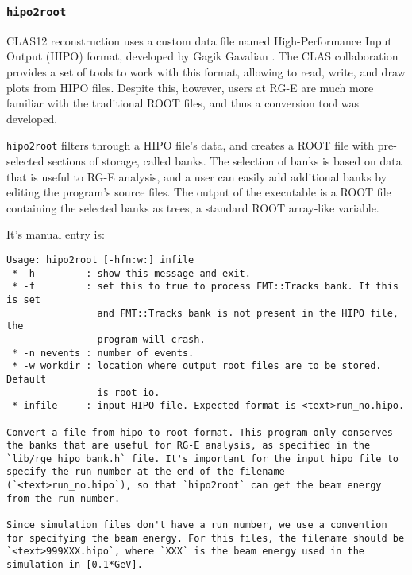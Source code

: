 \subsubsection{\texttt{hipo2root}}
\label{sssec::hipo2root}
    CLAS12 reconstruction uses a custom data file named High-Performance Input Output (HIPO) format, developed by Gagik Gavalian \cite{chekanov2021}.
    The CLAS collaboration provides a set of tools to work with this format, allowing to read, write, and draw plots from HIPO files.
    Despite this, however, users at RG-E are much more familiar with the traditional ROOT files, and thus a conversion tool was developed.

    \texttt{hipo2root} filters through a HIPO file's data, and creates a ROOT file with pre-selected sections of storage, called banks.
    The selection of banks is based on data that is useful to RG-E analysis, and a user can easily add additional banks by editing the program's source files.
    The output of the executable is a ROOT file containing the selected banks as trees, a standard ROOT array-like variable.

    It's manual entry is:
    \begin{lstlisting}
Usage: hipo2root [-hfn:w:] infile
 * -h         : show this message and exit.
 * -f         : set this to true to process FMT::Tracks bank. If this is set
                and FMT::Tracks bank is not present in the HIPO file, the
                program will crash.
 * -n nevents : number of events.
 * -w workdir : location where output root files are to be stored. Default
                is root_io.
 * infile     : input HIPO file. Expected format is <text>run_no.hipo.

Convert a file from hipo to root format. This program only conserves the banks that are useful for RG-E analysis, as specified in the `lib/rge_hipo_bank.h` file. It's important for the input hipo file to specify the run number at the end of the filename (`<text>run_no.hipo`), so that `hipo2root` can get the beam energy from the run number.

Since simulation files don't have a run number, we use a convention for specifying the beam energy. For this files, the filename should be `<text>999XXX.hipo`, where `XXX` is the beam energy used in the simulation in [0.1*GeV].
    \end{lstlisting}

